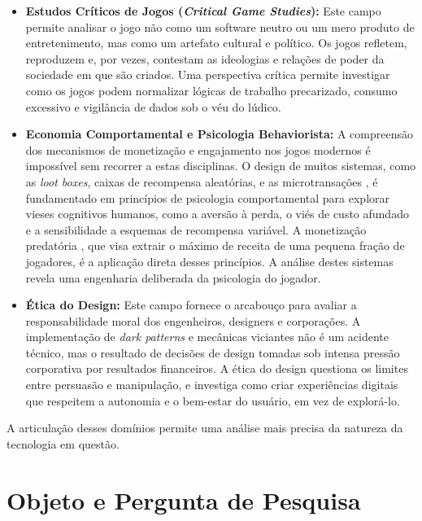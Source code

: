 \begin{itemize}
    \item \textbf{Estudos Críticos de Jogos (\textit{Critical Game Studies}):} Este campo permite analisar o jogo não como um 
    software neutro ou um mero produto de entretenimento, mas como um artefato cultural e político. Os jogos refletem, reproduzem e, 
    por vezes, contestam as ideologias e relações de poder da sociedade em que são criados. Uma perspectiva crítica permite 
    investigar como os jogos podem normalizar lógicas de trabalho precarizado, consumo excessivo e vigilância de dados sob o véu do 
    lúdico. 

    \item \textbf{Economia Comportamental e Psicologia Behaviorista:} A compreensão dos mecanismos de monetização e engajamento nos 
    jogos modernos é impossível sem recorrer a estas disciplinas. O design de muitos sistemas, como as \textit{loot boxes}, 
    caixas de recompensa aleatórias, e as microtransações \cite{GordonPetrovskaya2023}, é fundamentado em princípios de psicologia comportamental para explorar 
    vieses cognitivos humanos, como a aversão à perda, o viés de custo afundado e a sensibilidade a esquemas de recompensa variável. 
    A monetização predatória \cite{PetrovskayaZendle2022}, que visa extrair o máximo de receita de uma pequena fração de jogadores, é a aplicação direta desses 
    princípios. A análise destes sistemas revela uma engenharia deliberada da psicologia do jogador.

    \item \textbf{Ética do Design:} Este campo fornece o arcabouço para avaliar a responsabilidade moral dos engenheiros, designers 
    e corporações. A implementação de \textit{dark patterns} \cite{Lupianez-Villanueva2022} e mecânicas viciantes não é um acidente técnico, mas o resultado de 
    decisões de design tomadas sob intensa pressão corporativa por resultados financeiros. A ética do design questiona os limites 
    entre persuasão e manipulação, e investiga como criar experiências digitais que respeitem a autonomia e o bem-estar do usuário, 
    em vez de explorá-lo. 
\end{itemize}

A articulação desses domínios permite uma análise mais precisa da natureza da tecnologia em questão.

\section{Objeto e Pergunta de Pesquisa}\label{sec:obj_pergunta_pesquisa}

